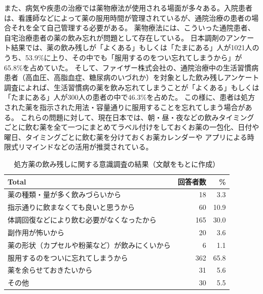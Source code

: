 また、病気や疾患の治療では薬物療法が使用される場面が多々ある。入院患者は、看護師などによって薬の服用時間が管理されているが、通院治療の患者の場合それを全て自己管理する必要がある。
薬物療法には、こういった通院患者、自宅治療患者の薬の飲み忘れが問題として存在している。\cite{hokkaido_mc_forget_medicine} \cite{drug_treatment_investigation} \cite{jp_mc_forget_medicine}
日本調剤のアンケート結果では、薬の飲み残しが「よくある」もしくは「たまにある」人が1021人のうち、53.9\%に上り、その中でも「服用するのをつい忘れてしまうから」が65.8\%を占めていた。\cite{jp_mc_forget_medicine}
そして、ファイザー株式会社の、通院治療中の生活習慣病患者（高血圧、高脂血症、糖尿病のいづれか）を対象とした飲み残しアンケート調査によれば、生活習慣病の薬を飲み忘れてしまうことが「よくある」もしくは「たまにある」人が300人の患者の中で46.3\%を占めた。
この様に、患者は処方された薬を指示された用法・容量通りに服用することを忘れてしまう場合がある。
これらの問題に対して、現在日本では、朝・昼・夜などの飲みタイミングごとに飲む薬を全て一つにまとめてラベル付けをしておくお薬の一包化、日付や曜日、タイミングごとに飲む薬を分けておくお薬カレンダーや
アプリによる時限式リマインドなどの活用が推奨されている。\cite{jp_mc_countermeasure}

\begin{table}[htbp]
  \caption{処方薬の飲み残しに関する意識調査の結果（文献\cite{jp_mc_forget_medicine}をもとに作成）}
  \label{tbl:forget_medicine_number}
  \begin{center}
    \begin{tabular}{|l||r||r|}
      \hline
      Total  & 回答者数 & \% \\
      \hline\hline
      薬の種類・量が多く飲みづらいから  & 18 & 3.3 \\\hline
      指示通りに飲まなくても良いと思うから  & 60 & 10.9 \\\hline
      体調回復などにより飲む必要がなくなったから  & 165 & 30.0 \\\hline
      副作用が怖いから  & 20 & 3.6 \\\hline
      薬の形状（カプセルや粉薬など）が飲みにくいから  & 6 & 1.1 \\\hline
      服用するのをついに忘れてしまうから  & 362 & 65.8 \\\hline
      薬を余らせておきたいから  & 31 & 5.6 \\\hline
      その他  & 30 & 5.5 \\\hline
    \end{tabular}
  \end{center}
\end{table}


